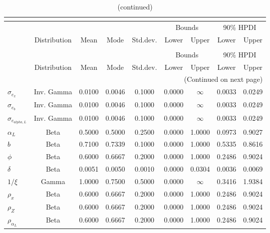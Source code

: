  
\begin{center}
\begin{longtable}{lcccccccc} 
\caption{Prior information (parameters)}\\
 \label{Table:Prior}\\
\toprule%
  &  &  &  &  & \multicolumn{2}{c}{Bounds} & \multicolumn{2}{c}{90\% HPDI} \\ 
  \cmidrule(r{.75em}){6-7} \cmidrule(r{.75em}){8-9}
  & Distribution & Mean & Mode & Std.dev. & Lower & Upper & Lower & Upper  \\ 
\midrule
\endfirsthead
\caption{(continued)}\\
 \toprule%
  &  &  &  &  & \multicolumn{2}{c}{Bounds} & \multicolumn{2}{c}{90\% HPDI} \\ 
  \cmidrule(r{.75em}){6-7} \cmidrule(r{.75em}){8-9}
  & Distribution & Mean & Mode & Std.dev. & Lower & Upper & Lower & Upper  \\ 
\midrule
\endhead
\midrule
\multicolumn{9}{r}{(Continued on next page)} \\ 
\bottomrule
\endfoot
\bottomrule
\endlastfoot
$ \sigma_{{e_x}} $ & Inv. Gamma & 0.0100 & 0.0046 & 0.1000 & 0.0000 & $\infty$ & 0.0033 & 0.0249 \\ 
$ \sigma_{{e_{b}}} $ & Inv. Gamma & 0.0100 & 0.0046 & 0.1000 & 0.0000 & $\infty$ & 0.0033 & 0.0249 \\ 
$ \sigma_{{e_{alpha,L}}} $ & Inv. Gamma & 0.0100 & 0.0046 & 0.1000 & 0.0000 & $\infty$ & 0.0033 & 0.0249 \\ 
$ \alpha_L $ & Beta & 0.5000 & 0.5000 & 0.2500 & 0.0000 & 1.0000 & 0.0973 & 0.9027 \\ 
$ b $ & Beta & 0.7100 & 0.7339 & 0.1000 & 0.0000 & 1.0000 & 0.5335 & 0.8616 \\ 
$ \phi $ & Beta & 0.6000 & 0.6667 & 0.2000 & 0.0000 & 1.0000 & 0.2486 & 0.9024 \\ 
$ {\delta} $ & Beta & 0.0051 & 0.0050 & 0.0010 & 0.0000 & 0.0304 & 0.0036 & 0.0069 \\ 
$ {1/\xi} $ & Gamma & 1.0000 & 0.7500 & 0.5000 & 0.0000 & $\infty$ & 0.3416 & 1.9384 \\ 
$ {\rho_x} $ & Beta & 0.6000 & 0.6667 & 0.2000 & 0.0000 & 1.0000 & 0.2486 & 0.9024 \\ 
$ {\rho_Z} $ & Beta & 0.6000 & 0.6667 & 0.2000 & 0.0000 & 1.0000 & 0.2486 & 0.9024 \\ 
$ {\rho_{\alpha_L}} $ & Beta & 0.6000 & 0.6667 & 0.2000 & 0.0000 & 1.0000 & 0.2486 & 0.9024 \\ 
\end{longtable}
 \end{center}
